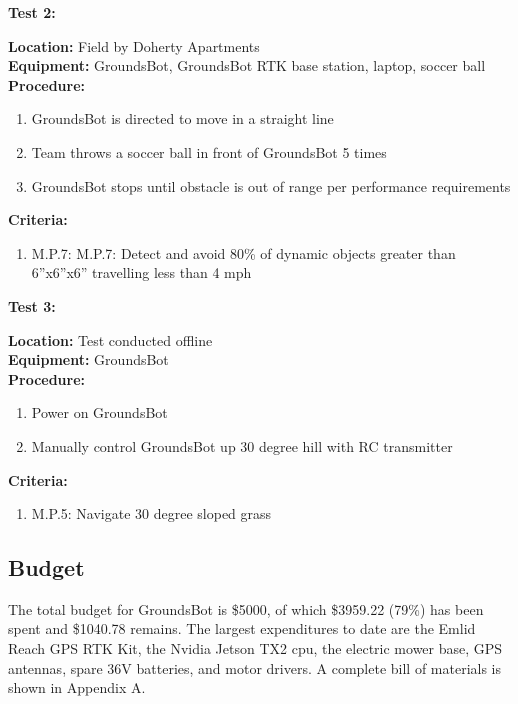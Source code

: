 \documentclass[12pt]{extarticle}
\begin{document}
\begin{center}
 \textbf{Test 2: }
\end{center}
\textbf{Location:} Field by Doherty Apartments\\
\textbf{Equipment:} GroundsBot, GroundsBot RTK base station, laptop, soccer ball\\
\textbf{Procedure:}
\begin{enumerate}
\item GroundsBot is directed to move in a straight line

\item Team throws a soccer ball in front of GroundsBot 5 times

\item GroundsBot stops until obstacle is out of range per performance requirements
\end{enumerate}

\noindent
\textbf{Criteria:}
\begin{enumerate}
\item M.P.7: M.P.7: Detect and avoid 80\% of dynamic objects greater than 6”x6”x6” travelling less than 4 mph

\end{enumerate}

\begin{center}
 \textbf{Test 3: }
\end{center}
\textbf{Location:} Test conducted offline\\
\textbf{Equipment:} GroundsBot\\
\textbf{Procedure:}
\begin{enumerate}
\item Power on GroundsBot
\item Manually control GroundsBot up 30 degree hill with RC transmitter
\end{enumerate}

\noindent
\textbf{Criteria:}

\begin{enumerate}
\item M.P.5: Navigate 30 degree sloped grass
\end{enumerate}


\subsection{Budget}
The total budget for GroundsBot is \$5000, of which \$3959.22 (79\%) has been spent and \$1040.78 remains. The largest expenditures to date are the Emlid Reach GPS RTK Kit, the Nvidia Jetson TX2 cpu, the electric mower base, GPS antennas, spare 36V batteries, and motor drivers. A complete bill of materials is shown in Appendix A.
\end{document}
